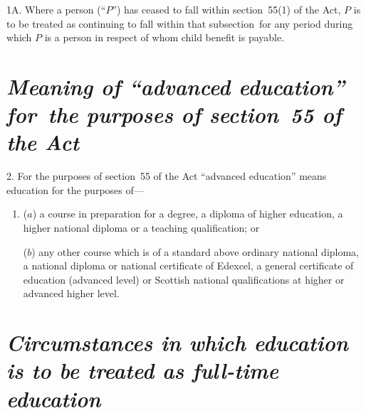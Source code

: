 \documentclass[12pt,a4paper]{article}
\begin{document}
1A.  Where a person (“$P$”) has ceased to fall within section~55(1) of the Act, $P$ is to be treated as continuing to fall within that subsection~for any period during which $P$ is a person in respect of whom child benefit is payable.

\section*{\itshape Meaning of “advanced education” for~the purposes of section~55 of the Act}

%

2.  For the purposes of section~55 of the Act “advanced education” means education for the purposes of—
\begin{enumerate}\item[]
($a$) a course in preparation for a degree, a diploma of higher education, a higher national diploma or a teaching qualification; or

($b$) any other course which is of a standard above ordinary national diploma, a national diploma or national certificate of Edexcel, a general certificate of education (advanced level) or Scottish national qualifications at higher or advanced higher level.
\end{enumerate}


\section*{\itshape Circumstances in which education is to be treated as full-time education}
\end{document}
